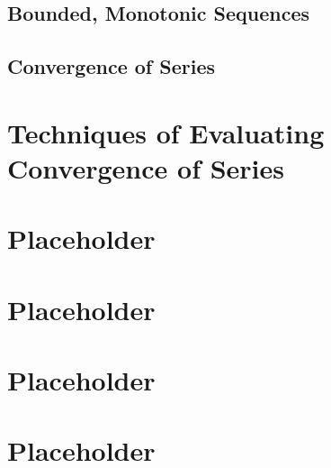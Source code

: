 \documentclass[a4paper]{article}
\begin{document}
  \subsection{Bounded, Monotonic Sequences}
  \subsection{Convergence of Series}
  \section{Techniques of Evaluating Convergence of Series} 
  \section{Placeholder} 
  \section{Placeholder} 
  \section{Placeholder} 
  \section{Placeholder} 
\end{document}

